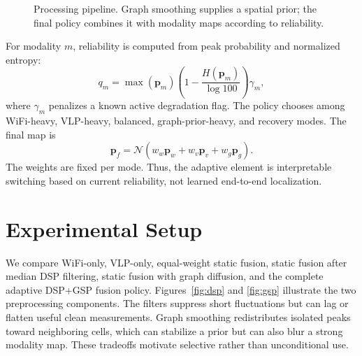 \documentclass[conference]{IEEEtran}
\begin{document}
\begin{figure}[t]
\centering
{}
\caption{Processing pipeline. Graph smoothing supplies a spatial prior; the final policy combines it with modality maps according to reliability.}
\label{fig:pipeline}
\end{figure}

For modality $m$, reliability is computed from peak probability and normalized entropy:
\begin{equation}
 q_m=\max(\mathbf{p}_{m})\left(1-\frac{H(\mathbf{p}_{m})}{\log 100}\right)\gamma_m,
 \label{eq:reliability}
\end{equation}
where $\gamma_m$ penalizes a known active degradation flag. The policy chooses among WiFi-heavy, VLP-heavy, balanced, graph-prior-heavy, and recovery modes. The final map is
\begin{equation}
 \mathbf{p}_{f}=\mathcal{N}\!\left(w_w\mathbf{p}_{w}+w_v\mathbf{p}_{v}+w_g\mathbf{p}_{g}\right).
 \label{eq:fusion}
\end{equation}
The weights are fixed per mode. Thus, the adaptive element is interpretable switching based on current reliability, not learned end-to-end localization.

\section{Experimental Setup}
We compare WiFi-only, VLP-only, equal-weight static fusion, static fusion after median DSP filtering, static fusion with graph diffusion, and the complete adaptive DSP+GSP fusion policy. Figures~\ref{fig:dsp} and \ref{fig:gsp} illustrate the two preprocessing components. The filters suppress short fluctuations but can lag or flatten useful clean measurements. Graph smoothing redistributes isolated peaks toward neighboring cells, which can stabilize a prior but can also blur a strong modality map. These tradeoffs motivate selective rather than unconditional use.
\end{document}
